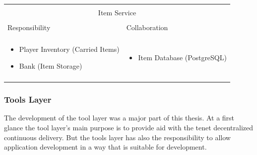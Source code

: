 \vspace{0.5cm}

\begin{tabular}{|l|l|}
    \cline{1-2}
    \multicolumn{2}{|c|}{} \\[-0.3cm]
    \multicolumn{2}{|c|}{Item Service} \\ 
    \multicolumn{2}{|c|}{} \\[-0.3cm]
    \cline{1-2}
    Responsibility & Collaboration \\
    \cline{1-2}
    & \\[-0.2cm]
    \begin{minipage}{6.5cm}
        \begin{itemize}
          \item Player Inventory (Carried Items)
          \item Bank (Item Storage)
        \end{itemize} 
    \end{minipage}
	&
    \begin{minipage}{6.5cm}
        \begin{itemize}
          \item Item Database (PostgreSQL)
        \end{itemize} 
    \end{minipage}
	\\ & \\
    \hline
\end{tabular}

\subsubsection{Tools Layer}

The development of the tool layer was a major part of this thesis. At a first
glance the tool layer's main purpose is to provide aid with the tenet
decentralized continuous delivery. But the tools layer has also the
responsibility to allow \ms{} application development in a way that is suitable
for \og{} development.\\

